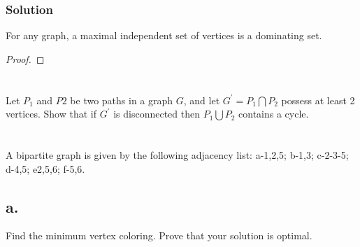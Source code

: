 \documentclass{amsart}
\begin{document}
\subsubsection{Solution}
For any graph, a maximal independent set of vertices is a dominating set.
\begin{proof}
\end{proof}

\section{}

Let $P_1$ and $P2$ be two paths in a graph $G$, and let $G^\prime=P_1 \bigcap P_2$ possess at least 2
vertices.
Show that if $G^\prime$ is disconnected then $P_1\bigcup P_2$ contains a cycle.

\section{}
A bipartite graph is given by the following adjacency list: a-1,2,5; b-1,3; c-2-3-5; d-4,5; e2,5,6; f-5,6.

\begin{figure}[h]
\end{figure}
\subsection*{a.}
Find the minimum vertex coloring. Prove that your solution is optimal.
\end{document}
